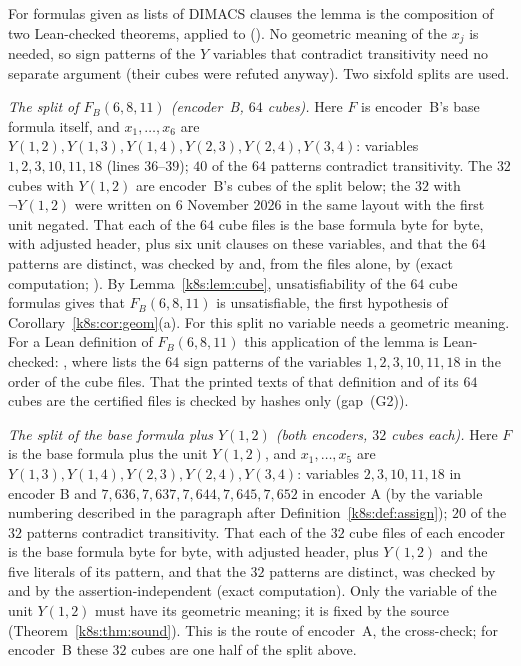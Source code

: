 For formulas given as lists of DIMACS clauses the lemma is the composition of two Lean-checked theorems,
 applied to 
().
No geometric meaning of the $x_j$ is needed, so sign patterns of the $Y$ variables that contradict transitivity need
no separate argument (their cubes were refuted anyway). Two sixfold splits are used.

\emph{The split of $F_B(6,8,11)$ (encoder~B, $64$ cubes).} Here $F$ is encoder~B's base formula itself, and
$x_1,\dots,x_6$ are $Y(1,2),Y(1,3),Y(1,4),Y(2,3),Y(2,4),Y(3,4)$: variables $1,2,3,10,11,18$ (lines 36--39); $40$ of the
$64$ patterns contradict transitivity. The $32$ cubes with $Y(1,2)$ are encoder~B's cubes of the split below; the $32$
with $\neg Y(1,2)$ were written on 6 November 2026 in the same layout with the first unit negated. That each of the
$64$ cube files is the base formula byte for byte, with adjusted header, plus six unit clauses on these variables, and
that the $64$ patterns are distinct, was checked by  and, from the files alone, by
 (exact computation; ). By Lemma~\ref{k8s:lem:cube},
unsatisfiability of the $64$ cube formulas gives that $F_B(6,8,11)$ is unsatisfiable, the first hypothesis of
Corollary~\ref{k8s:cor:geom}(a). For this split no variable needs a geometric meaning. For a Lean definition of
$F_B(6,8,11)$ this application of the lemma is Lean-checked: , where
 lists the $64$ sign patterns of the variables
$1,2,3,10,11,18$ in the order of the cube files. That the printed texts of that definition and of its $64$ cubes are
the certified files is checked by hashes only (gap~(G2)).

\emph{The split of the base formula plus $Y(1,2)$ (both encoders, $32$ cubes each).} Here $F$ is the
base formula plus the unit $Y(1,2)$, and $x_1,\dots,x_5$ are $Y(1,3),Y(1,4),Y(2,3),Y(2,4),Y(3,4)$: variables
$2,3,10,11,18$ in encoder B and $7{,}636,7{,}637,7{,}644,7{,}645,7{,}652$ in encoder A (by the variable numbering
described in the paragraph after Definition~\ref{k8s:def:assign}); $20$ of the $32$ patterns contradict transitivity.
That each of the $32$ cube files of each encoder is the base formula byte for byte,
with adjusted header, plus $Y(1,2)$ and the five literals of its pattern, and that the $32$ patterns are distinct, was
checked by  and by the assertion-independent 
(exact computation). Only the variable of the unit $Y(1,2)$ must have its geometric meaning; it is fixed by the source
(Theorem~\ref{k8s:thm:sound}). This is the route of encoder~A, the cross-check; for encoder~B these $32$ cubes are one
half of the split above.

